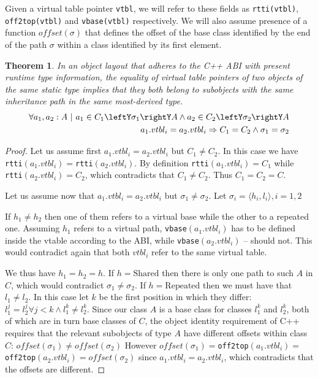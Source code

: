 \documentclass[preprint]{sigplanconf}
\makeatletter
\DeclareRobustCommand{\code}[1]{{\lstinline[breaklines=false,escapechar=@]{#1}}}
\newtheorem{theorem}{Theorem}
\makeatother
\begin{document}
\noindent
Given a virtual table pointer \code{vtbl}, we will refer to these fields as 
\code{rtti(vtbl)}, \code{off2top(vtbl)} and \code{vbase(vtbl)} respectively. 
We will also assume presence of a function $\mathit{offset}(\sigma)$ that defines the 
offset of the base class identified by the end of the path $\sigma$ within a 
class identified by its first element.

\begin{theorem}
In an object layout that adheres to the C++ ABI with present runtime type 
information, the equality of virtual table pointers of two objects of the same 
static type implies that they both belong to subobjects with the same 
inheritance path in the same most-derived type.
\begin{eqnarray*}
    \forall a_1, a_2 : A\ |\ a_1\in C_1\leftY\sigma_1\rightY A \wedge a_2\in C_2\leftY\sigma_2\rightY A \\
    a_1.vtbl_i = a_2.vtbl_i \Rightarrow C_1 = C_2 \wedge \sigma_1 = \sigma_2
\end{eqnarray*}
\label{thm:vtbl}
\end{theorem}
\begin{proof}
Let us assume first $a_1.vtbl_i = a_2.vtbl_i$ but $C_1 \neq C_2$. In this case we 
have \code{rtti}$(a_1.vtbl_i) = $\code{rtti}$(a_2.vtbl_i)$. By definition 
\code{rtti}$(a_1.vtbl_i) = C_1$ while \code{rtti}$(a_2.vtbl_i) = C_2$, which 
contradicts that $C_1 \neq C_2$. Thus $C_1 = C_2 = C$.

Let us assume now that $a_1.vtbl_i = a_2.vtbl_i$ but $\sigma_1 \neq \sigma_2$. 
Let $\sigma_i=\langle h_i,l_i\rangle,i=1,2$ 

If $h_1 \neq h_2$ then one of them refers to a virtual base while the other to a 
repeated one. Assuming $h_1$ refers to a virtual path, \code{vbase}$(a_1.vtbl_i)$ 
has to be defined inside the vtable according to the ABI, while 
\code{vbase}$(a_2.vtbl_i)$ -- should not. This would contradict again that both 
$vtbl_i$ refer to the same virtual table.

We thus have $h_1 = h_2 = h$. If $h = \mathrm{Shared}$ then there is only one path to 
such $A$ in $C$, which would contradict $\sigma_1 \neq \sigma_2$. 
If $h = \mathrm{Repeated}$ then we must have that $l_1 \neq l_2$. In this case let $k$ be 
the first position in which they differ: 
$l_1^j=l_2^j \forall j<k \wedge l_1^k\neq l_2^k$. Since our class $A$ is a base 
class for classes $l_1^k$ and $l_2^k$, both of which are in turn base classes of 
$C$, the object identity requirement of C++ requires that the relevant subobjects 
of type $A$ have different offsets within class $C$: 
$\mathit{offset}(\sigma_1)\neq \mathit{offset}(\sigma_2)$ However 
$\mathit{offset}(\sigma_1)=$\code{off2top}$(a_1.vtbl_i)=$\code{off2top}$(a_2.vtbl_i)=\mathit{offset}(\sigma_2)$ 
since $a_1.vtbl_i = a_2.vtbl_i$, which contradicts that the offsets are different.
\end{proof}
\end{document}
